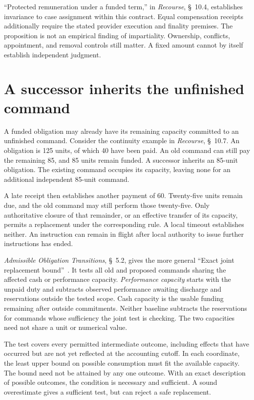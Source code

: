 \documentclass{momentum}
\begin{document}
``Protected remuneration under a funded term,'' in \emph{Recourse}, \S~10.4, establishes invariance to case assignment within this contract. Equal compensation receipts additionally require the stated provider execution and finality premises. The proposition is not an empirical finding of impartiality. Ownership, conflicts, appointment, and removal controls still matter. A fixed amount cannot by itself establish independent judgment.

\section{A successor inherits the unfinished command}

A funded obligation may already have its remaining capacity committed to an unfinished command. Consider the continuity example in \emph{Recourse}, \S~10.7. An obligation is 125 units, of which 40 have been paid. An old command can still pay the remaining 85, and 85 units remain funded. A successor inherits an 85-unit obligation. The existing command occupies its capacity, leaving none for an additional independent 85-unit command.

A late receipt then establishes another payment of 60. Twenty-five units remain due, and the old command may still perform those twenty-five. Only authoritative closure of that remainder, or an effective transfer of its capacity, permits a replacement under the corresponding rule. A local timeout establishes neither. An instruction can remain in flight after local authority to issue further instructions has ended.

\emph{Admissible Obligation Transitions}, \S~5.2, gives the more general ``Exact joint replacement bound''~\cite{obligation-transitions}. It tests all old and proposed commands sharing the affected cash or performance capacity. \emph{Performance capacity} starts with the unpaid duty and subtracts observed performance awaiting discharge and reservations outside the tested scope. Cash capacity is the usable funding remaining after outside commitments. Neither baseline subtracts the reservations for commands whose sufficiency the joint test is checking. The two capacities need not share a unit or numerical value.

The test covers every permitted intermediate outcome, including effects that have occurred but are not yet reflected at the accounting cutoff. In each coordinate, the least upper bound on possible consumption must fit the available capacity. The bound need not be attained by any one outcome. With an exact description of possible outcomes, the condition is necessary and sufficient. A sound overestimate gives a sufficient test, but can reject a safe replacement.
\end{document}

